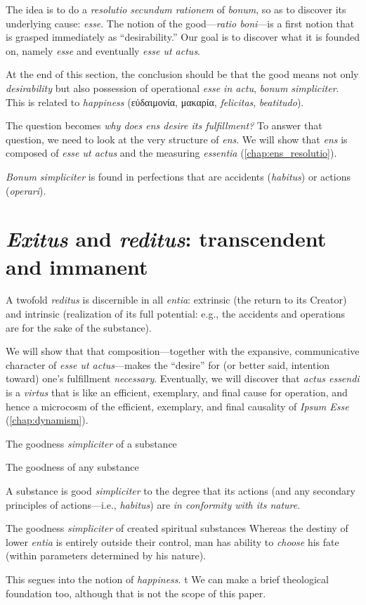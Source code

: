 \begin{DONE}

The idea is to do a \emph{resolutio secundum rationem} of \emph{bonum}, so as to discover its underlying cause: \emph{esse}. The notion of the good—\emph{ratio boni}—is a first notion that is grasped immediately as \enquote{desirability.}
Our goal is to discover what it is founded on, namely \emph{esse} and eventually \emph{esse ut actus}.

At the end of this section, the conclusion should be that the good means not only \emph{desirability} but also possession of operational \emph{esse in actu}, \emph{bonum simpliciter}. This is related to \emph{happiness} (εὐδαιμονία, μακαρία, \emph{felicitas}, \emph{beatitudo}).


The question becomes \emph{why does \emph{ens} desire its fulfillment?} To answer that question, we need to look at the very structure of \emph{ens}. We will show that \emph{ens} is composed of \emph{esse ut actus} and the measuring \emph{essentia} (\autoref{chap:ens_resolutio}).

\emph{Bonum simpliciter} is found in perfections that are accidents (\emph{habitus}) or actions (\emph{operari}).

\section{\emph{Exitus} and \emph{reditus}: transcendent and immanent}
A twofold \emph{reditus} is discernible in all \emph{entia}: extrinsic (the return to its Creator) and intrinsic (realization of its full potential: e.g., the accidents and operations are for the sake of the substance).

We will show that that composition—together with the expansive, communicative character of \emph{esse ut actus}—makes the \enquote{desire} for (or better said, intention toward) one’s fulfillment \emph{necessary}. Eventually, we will discover that \emph{actus essendi} is a \emph{virtus} that is like an efficient, exemplary, and final cause for operation, and hence a microcosm of the efficient, exemplary, and final causality of \emph{Ipsum Esse} (\autoref{chap:dynamism}).


{The goodness \emph{simpliciter} of a substance}

{The goodness of any substance}


A substance is good \emph{simpliciter} to the degree that its actions (and any secondary principles of actions—i.e., \emph{habitus}) are \emph{in conformity with its nature}.

{The goodness \emph{simpliciter} of created spiritual substances}
Whereas the destiny of lower \emph{entia} is entirely outside their control, man has ability to \emph{choose} his fate (within parameters determined by his nature).

This segues into the notion of \emph{happiness}.
t
We can make a brief theological foundation too, although that is not the scope of this paper.

\end{DONE}